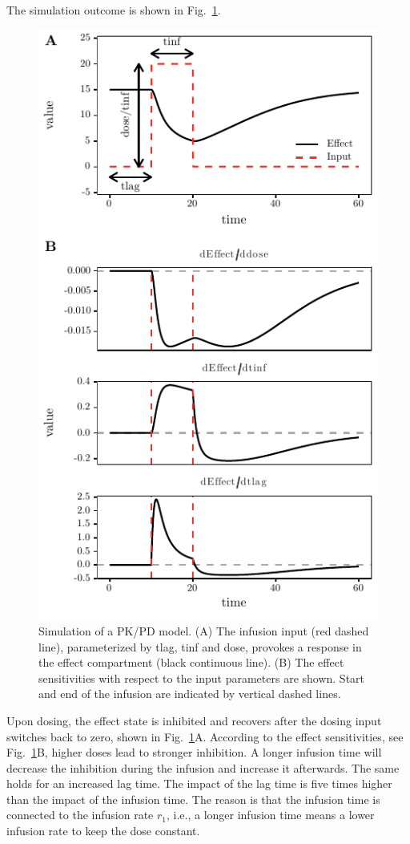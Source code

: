 \documentclass[journal, a4paper]{IEEEtran}
\begin{document}
The simulation outcome is shown in Fig.~\ref{fig:simulation}.
\begin{figure}[ht]
    \centering
    \includegraphics{Code/example.pdf}
    \caption{Simulation of a PK/PD model. (A) The infusion input (red dashed line), parameterized by tlag, tinf and dose, provokes a response in the effect compartment (black continuous line). (B) The effect sensitivities with respect to the input parameters are shown. Start and end of the infusion are indicated by vertical dashed lines.}
    \label{fig:simulation}
\end{figure}
Upon dosing, the effect state is inhibited and recovers after the dosing input switches back to zero, shown in Fig.~\ref{fig:simulation}A. According to the effect sensitivities, see Fig.~\ref{fig:simulation}B, higher doses lead to stronger inhibition. A longer infusion time will decrease the inhibition during the infusion and increase it afterwards. The same holds for an increased lag time. The impact of the lag time is five times higher than the impact of the infusion time. The reason is that the infusion time is connected to the infusion rate $r_1$, i.e., a longer infusion time means a lower infusion rate to keep the dose constant.
\end{document}
